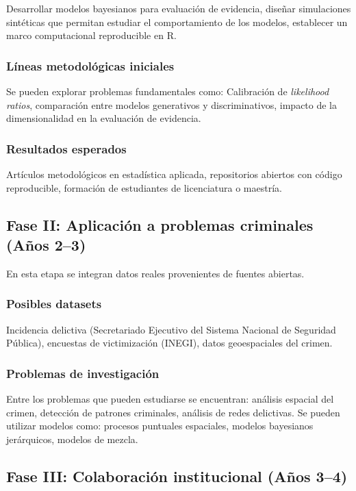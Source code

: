 \documentclass[a4paper,10pt,oneside]{article}
\begin{document}
Desarrollar modelos bayesianos para evaluaci\'on de evidencia, dise\~nar simulaciones sint\'eticas que permitan estudiar el comportamiento de los modelos,
 establecer un marco computacional reproducible en \textsf{R}.


\subsubsection*{L\'ineas metodol\'ogicas iniciales}

Se pueden explorar problemas fundamentales como: Calibraci\'on de \textit{likelihood ratios}, comparaci\'on entre modelos generativos y discriminativos, impacto de la dimensionalidad en la evaluaci\'on de evidencia.

\subsubsection*{Resultados esperados}

Art\'iculos metodol\'ogicos en estad\'istica aplicada, repositorios abiertos con c\'odigo reproducible, formaci\'on de estudiantes de licenciatura o maestr\'ia.

\subsection{Fase II: Aplicaci\'on a problemas criminales (A\~nos 2--3)}

En esta etapa se integran datos reales provenientes de fuentes abiertas.

\subsubsection*{Posibles datasets}

Incidencia delictiva (Secretariado Ejecutivo del Sistema Nacional de Seguridad P\'ublica), encuestas de victimizaci\'on (INEGI), datos geoespaciales del crimen.

\subsubsection*{Problemas de investigaci\'on}

Entre los problemas que pueden estudiarse se encuentran: an\'alisis espacial del crimen, detecci\'on de patrones criminales, an\'alisis de redes delictivas. Se pueden utilizar modelos como: procesos puntuales espaciales, modelos bayesianos jer\'arquicos, modelos de mezcla.

\subsection{Fase III: Colaboraci\'on institucional (A\~nos 3--4)}
\end{document}
